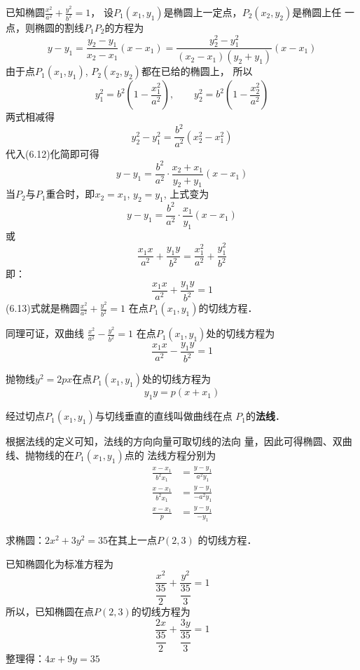 已知椭圆$\frac{x^2}{a^2}+\frac{y^2}{b^2}=1$，
设$P_1(x_1,y_1)$是椭圆上一定点，$P_2(x_2,y_2)$是椭圆上任
一点，则椭圆的割线$P_1P_2$的方程为
\begin{equation}
    y-y_1=\frac{y_2-y_1}{x_2-x_1}(x-x_1)=\frac{y^2_2-y^2_1}{(x_2-x_1)(y_2+y_1)}(x-x_1)
\end{equation}
由于点$P_1(x_1,y_1)$, $P_2(x_2,y_2)$都在已给的椭圆上，
所以
\[y^2_1=b^2\left(1-\frac{x^2_1}{a^2}\right),\qquad y^2_2=b^2\left(1-\frac{x^2_2}{a^2}\right)\]
两式相减得
\[y_2^2-y_1^2=\frac{b^2}{a^2}(x^2_2-x^2_1)\]
代入(6.12)化简即可得
\[y-y_1=\frac{b^2}{a^2}\cdot \frac{x_2+x_1}{y_2+y_1}(x-x_1)\]
当$P_2$与$P_1$重合时，即$x_2=x_1$, $y_2=y_1$, 上式变为
\[y-y_1=\frac{b^2}{a^2}\cdot \frac{x_1}{y_1}(x-x_1)\]
或
\[\frac{x_1x}{a^2}+\frac{y_1y}{b^2}=\frac{x_1^2}{a^2}+\frac{y_1^2}{b^2}\]
即：
\begin{equation}
    \boxed{\frac{x_1x}{a^2}+\frac{y_1y}{b^2}=1}
\end{equation}
(6.13)式就是椭圆$\frac{x^2}{a^2}+\frac{y^2}{b^2}=1$
在点$P_1(x_1,y_1)$的切线方程．

同理可证，双曲线
$\frac{x^2}{a^2}-\frac{y^2}{b^2}=1$
在点$P_1(x_1,y_1)$处的切线方程为
\begin{equation}
    \boxed{\frac{x_1x}{a^2}-\frac{y_1y}{b^2}=1}
\end{equation}

抛物线$y^2=2px$在点$P_1(x_1,y_1)$处的切线方程为
\begin{equation}
    \boxed{y_1y=p(x+x_1)}
\end{equation}

经过切点$P_1(x_1,y_1)$与切线垂直的直线叫做曲线在点
$P_1$的\textbf{法线}．

根据法线的定义可知，法线的方向向量可取切线的法向
量，因此可得椭圆、双曲线、抛物线的在$P_1(x_1,y_1)$点的
法线方程分别为
\begin{align}
    \frac{x-x_1}{b^2x_1}&=\frac{y-y_1}{a^2y_1}\\
    \frac{x-x_1}{b^2x_1}&=\frac{y-y_1}{-a^2y_1}\\
    \frac{x-x_1}{p}&=\frac{y-y_1}{-y_1}
\end{align}


\begin{example}
    求椭圆：$2x^2+3y^2=35$在其上一点$P(2,3)$
的切线方程．
\end{example}

\begin{solution}
    已知椭圆化为标准方程为
\[\frac{x^2}{\dfrac{35}{2}}+\frac{y^2}{\dfrac{35}{3}}=1\]
所以，已知椭圆在点$P(2,3)$的切线方程为
\[\frac{2x}{\dfrac{35}{2}}+\frac{3y}{\dfrac{35}{3}}=1\]
整理得：$4x+9y=35$
\end{solution}

